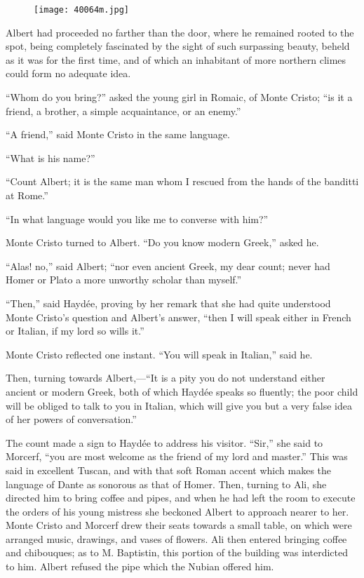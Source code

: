 \begin{figure}[ht]
\texttt{[image: 40064m.jpg]}
\end{figure}

Albert had proceeded no farther than the door, where he remained rooted
to the spot, being completely fascinated by the sight of such
surpassing beauty, beheld as it was for the first time, and of which an
inhabitant of more northern climes could form no adequate idea.

“Whom do you bring?” asked the young girl in Romaic, of Monte Cristo;
“is it a friend, a brother, a simple acquaintance, or an enemy.”

“A friend,” said Monte Cristo in the same language.

“What is his name?”

“Count Albert; it is the same man whom I rescued from the hands of the
banditti at Rome.”

“In what language would you like me to converse with him?”

Monte Cristo turned to Albert. “Do you know modern Greek,” asked he.

“Alas! no,” said Albert; “nor even ancient Greek, my dear count; never
had Homer or Plato a more unworthy scholar than myself.”

“Then,” said Haydée, proving by her remark that she had quite
understood Monte Cristo’s question and Albert’s answer, “then I will
speak either in French or Italian, if my lord so wills it.”

Monte Cristo reflected one instant. “You will speak in Italian,” said
he.

Then, turning towards Albert,—“It is a pity you do not understand
either ancient or modern Greek, both of which Haydée speaks so
fluently; the poor child will be obliged to talk to you in Italian,
which will give you but a very false idea of her powers of
conversation.”

The count made a sign to Haydée to address his visitor. “Sir,” she said
to Morcerf, “you are most welcome as the friend of my lord and master.”
This was said in excellent Tuscan, and with that soft Roman accent
which makes the language of Dante as sonorous as that of Homer. Then,
turning to Ali, she directed him to bring coffee and pipes, and when he
had left the room to execute the orders of his young mistress she
beckoned Albert to approach nearer to her. Monte Cristo and Morcerf
drew their seats towards a small table, on which were arranged music,
drawings, and vases of flowers. Ali then entered bringing coffee and
chibouques; as to M. Baptistin, this portion of the building was
interdicted to him. Albert refused the pipe which the Nubian offered
him.

